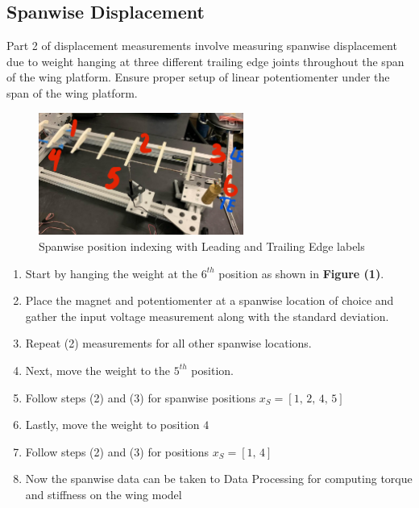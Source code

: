 \documentclass{article}
\begin{document}
  \subsection{Spanwise Displacement}
  Part 2 of displacement measurements involve measuring spanwise displacement due to weight hanging at three different trailing edge joints throughout the span of the wing platform. Ensure proper setup of linear potentiomenter under the span of the wing platform. 
  \begin{figure}[H]
    \centering
    \includegraphics[width=0.6\textwidth]{lab3images/SpanwiseLocations.jpg}
    \caption{Spanwise position indexing with Leading and Trailing Edge labels}
  \end{figure}
  
  \begin{enumerate}
    \item Start by hanging the weight at the $6^{th}$ position as shown in \textbf{Figure (1)}. 
    \vspace{2.5mm}

    \item Place the magnet and potentiomenter at a spanwise location of choice and gather the input voltage measurement along with the standard deviation.
    \vspace{2.5mm}

    \item Repeat (2) measurements for all other spanwise locations.
    \vspace{2.5mm}

    \item Next, move the weight to the $5^{th}$ position.
    \vspace{2.5mm}

    \item Follow steps (2) and (3) for spanwise positions $x_{S} = \left[1,\, 2,\, 4,\, 5\right]$
    \vspace{2.5mm}

    \item Lastly, move the weight to position $4$
    \vspace{2.5mm}

    \item Follow steps (2) and (3) for positions $x_{S} = \left[1,\, 4\right]$
    \vspace{2.5mm}
    
    \item Now the spanwise data can be taken to Data Processing for computing torque and stiffness on the wing model
  \end{enumerate}
\end{document}
